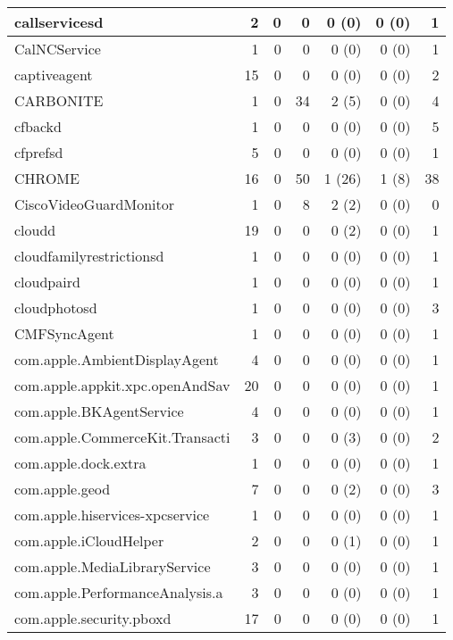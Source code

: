 \begin{adjustwidth}{-2in}{}
\begin{scriptsize}
\begin{longtable}[l]{ l | r | r | r | r | r | r }
    callservicesd &  2 &  0 &  0 &  0 (0) &  0 (0) &  1 \\ \hline
    CalNCService & 1 &  0 &  0 &  0 (0) &  0 (0) &  1 \\ \hline
    captiveagent &  15 &  0 &  0 &  0 (0) &  0 (0) &  2 \\ \hline
    CARBONITE &  1 &  0 & 34 &  2 (5) &  0 (0) &  4 \\ \hline
    cfbackd &  1 &  0 &  0 &  0 (0) &  0 (0) &  5 \\ \hline
    cfprefsd & 5 &  0 &  0 &  0 (0) &  0 (0) &  1 \\ \hline
    CHROME &  16 &  0 & 50 & 1 (26) &  1 (8) & 38 \\ \hline
    CiscoVideoGuardMonitor & 1 &  0 &  8 &  2 (2) &  0 (0) &  0 \\ \hline
    cloudd &  19 &  0 &  0 &  0 (2) &  0 (0) &  1 \\ \hline
    cloudfamilyrestrictionsd & 1 &  0 &  0 &  0 (0) &  0 (0) &  1 \\ \hline
    cloudpaird & 1 &  0 &  0 &  0 (0) &  0 (0) &  1 \\ \hline
    cloudphotosd & 1 &  0 &  0 &  0 (0) &  0 (0) &  3 \\ \hline
    CMFSyncAgent & 1 &  0 &  0 &  0 (0) &  0 (0) &  1 \\ \hline
    com.apple.AmbientDisplayAgent &  4 &  0 &  0 &  0 (0) &  0 (0) &  1 \\ \hline
    com.apple.appkit.xpc.openAndSav & 20 &  0 &  0 &  0 (0) &  0 (0) &  1 \\ \hline
    com.apple.BKAgentService & 4 &  0 &  0 &  0 (0) &  0 (0) &  1 \\ \hline
    com.apple.CommerceKit.Transacti &  3 &  0 &  0 &  0 (3) &  0 (0) &  2 \\ \hline
    com.apple.dock.extra & 1 &  0 &  0 &  0 (0) &  0 (0) &  1 \\ \hline
    com.apple.geod & 7 &  0 &  0 &  0 (2) &  0 (0) &  3 \\ \hline
    com.apple.hiservices-xpcservice &  1 &  0 &  0 &  0 (0) &  0 (0) &  1 \\ \hline
    com.apple.iCloudHelper & 2 &  0 &  0 &  0 (1) &  0 (0) &  1 \\ \hline
    com.apple.MediaLibraryService &  3 &  0 &  0 &  0 (0) &  0 (0) &  1 \\ \hline
    com.apple.PerformanceAnalysis.a &  3 &  0 &  0 &  0 (0) &  0 (0) &  1 \\ \hline
    com.apple.security.pboxd &  17 &  0 &  0 &  0 (0) &  0 (0) &  1 \\ \hline

\end{longtable}
\end{scriptsize}
\end{adjustwidth}
